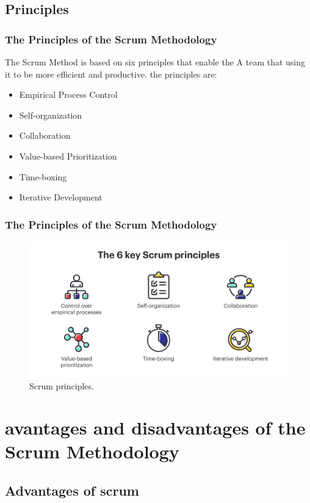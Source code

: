 \documentclass[
	11pt, %
]{beamer}
\begin{document}
\subsection{Principles}

\begin{frame}
	\frametitle{The Principles of the Scrum Methodology}
	The Scrum Method is based on six principles that enable the
	A team that using it to be more efficient and productive.
	the principles are:
	\newline

	\begin{itemize}
		\item Empirical Process Control
		\item Self-organization
		\item Collaboration
		\item Value-based Prioritization
		\item Time-boxing
		\item Iterative Development
	\end{itemize}

\end{frame}

\begin{frame}
	\frametitle{The Principles of the Scrum Methodology}
	\begin{figure}
		\includegraphics[width=0.8\linewidth]{principles.png}
		\caption{Scrum principles.}
	\end{figure}
\end{frame}


\section{avantages and disadvantages of the Scrum Methodology}

\subsection{Advantages of scrum}
\end{document}
